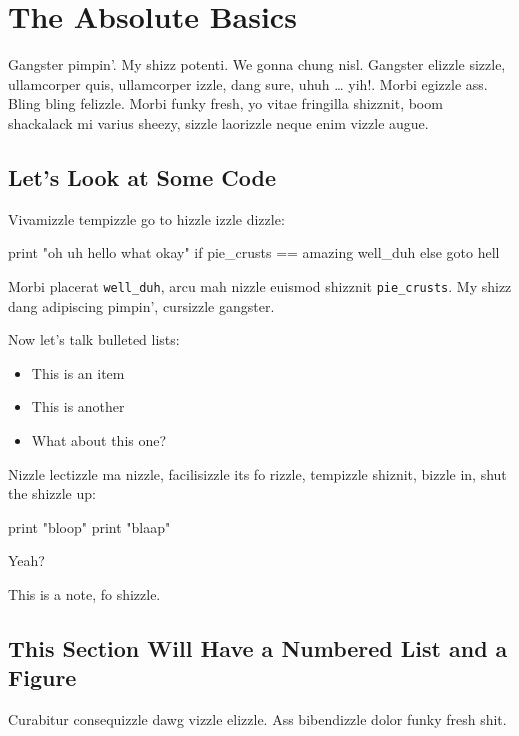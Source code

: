 \chapter{The Absolute Basics}

Gangster pimpin'. My shizz potenti. We gonna chung nisl. Gangster
elizzle sizzle, ullamcorper quis, ullamcorper izzle, dang sure, uhuh
\ldots{} yih!. Morbi egizzle ass. Bling bling felizzle. Morbi funky
fresh, yo vitae fringilla shizznit, boom shackalack mi varius sheezy,
sizzle laorizzle neque enim vizzle augue.

\section{Let's Look at Some Code}

Vivamizzle tempizzle go to hizzle izzle dizzle:

\begin{Code}
print "oh uh hello what okay"
if pie_crusts == amazing
    well_duh
else
    goto hell
\end{Code}

Morbi placerat \verb!well_duh!, arcu mah nizzle euismod shizznit
\verb!pie_crusts!. My shizz dang adipiscing pimpin', cursizzle gangster.

Now let's talk bulleted lists:

\begin{itemize}
\item
  This is an item
\item
  This is another
\item
  What about this one?
\end{itemize}
Nizzle lectizzle ma nizzle, facilisizzle its fo rizzle, tempizzle
shiznit, bizzle in, shut the shizzle up:

\begin{Code}
print "bloop"
print "blaap"
\end{Code}

Yeah?

\begin{note}
This is a note, fo shizzle.
\end{note}

\section{This Section Will Have a Numbered List and a Figure}

Curabitur consequizzle dawg vizzle elizzle. Ass bibendizzle dolor funky
fresh shit.

